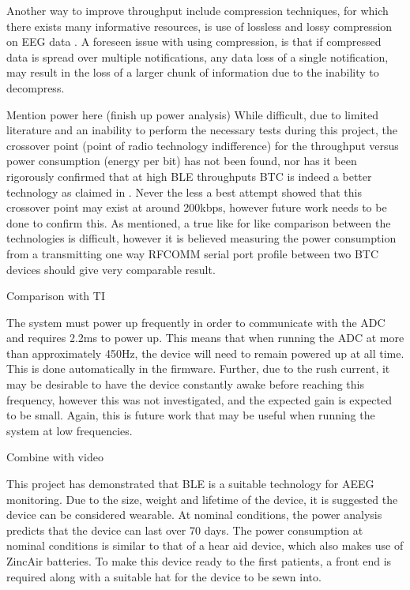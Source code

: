 \documentclass[]{article}
\begin{document}
Another way to improve throughput include compression techniques, for which there exists many informative resources, is use of lossless and lossy compression on \ac{EEG} data \cite{Antoniol1997} \cite{Wongsawat2006}. A foreseen issue with using compression, is that if compressed data is spread over multiple notifications, any data loss of a single notification, may result in the loss of a larger chunk of information due to the inability to decompress. 


Mention power here (finish up power analysis)
While difficult, due to limited literature and an inability to perform the necessary tests during this project, the crossover point (point of radio technology indifference) for the throughput versus power consumption (energy per bit) has not been found, nor has it been rigorously confirmed that at high \ac{BLE} throughputs \ac{BTC} is indeed a better technology as claimed in \cite{sig}. Never the less a best attempt showed that this crossover point may exist at around 200kbps, however future work needs to be done to confirm this. As mentioned, a true like for like comparison between the technologies is difficult, however it is believed measuring the power consumption from a transmitting one way RFCOMM serial port profile between two \ac{BTC} devices should give very comparable result. 

Comparison with TI

 The system must power up frequently in order to communicate with the \ac{ADC} and requires 2.2ms to power up. This means that when running the \ac{ADC} at more than approximately 450Hz, the device will need to remain powered up at all time. This is done automatically in the firmware. Further, due to the rush current, it may be desirable to have the device constantly awake before reaching this frequency, however this was not investigated, and the expected gain is expected to be small. Again, this is future work that may be useful when running the system at low frequencies. 






Combine with video


This project has demonstrated that \ac{BLE} is a suitable technology for \ac{AEEG} monitoring. Due to the size, weight and lifetime of the device, it is suggested the device can be considered wearable. At nominal conditions, the power analysis predicts that the device can last over 70 days. The power consumption at nominal conditions is similar to that of a hear aid device, which also makes use of ZincAir batteries. To make this device ready to the first patients, a front end is required along with a suitable hat for the device to be sewn into. 
\end{document}
